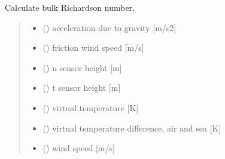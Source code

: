 \documentclass[letterpaper,10pt,english]{sphinxmanual}
\begin{document}
\begin{fulllineitems}

\pysigstartsignatures
{}
\pysigstopsignatures
\sphinxAtStartPar
Calculate bulk Richardson number.
\begin{quote}\begin{description}
\begin{itemize}
\item {} 
\sphinxAtStartPar
{} () \textendash{} acceleration due to gravity {[}m/s2{]}

\item {} 
\sphinxAtStartPar
{} () \textendash{} friction wind speed {[}m/s{]}

\item {} 
\sphinxAtStartPar
{} () \textendash{} u sensor height {[}m{]}

\item {} 
\sphinxAtStartPar
{} () \textendash{} t sensor height {[}m{]}

\item {} 
\sphinxAtStartPar
{} () \textendash{} virtual temperature {[}K{]}

\item {} 
\sphinxAtStartPar
{} () \textendash{} virtual temperature difference, air and sea {[}K{]}

\item {} 
\sphinxAtStartPar
{} () \textendash{} wind speed {[}m/s{]}


\end{itemize}
\end{description}
\end{quote}
\end{fulllineitems}
\end{document}
